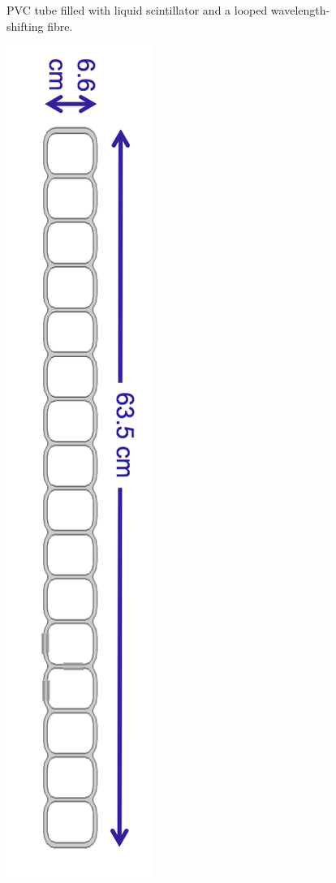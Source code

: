 \begin{figure}
\begin{minipage}{.45\textwidth}
{      PVC tube filled with liquid scintillator and a looped
      wavelength-shifting fibre. }
    \label{fig:cell}
  \end{minipage}%
  \hfill
  \begin{minipage}{.45\textwidth}
    \centering
    \includegraphics[height=0.4\textheight]{../../img/baird/det/extru_cross_section.png}
    \label{fig:extrusion}
  \end{minipage}
\end{figure}




